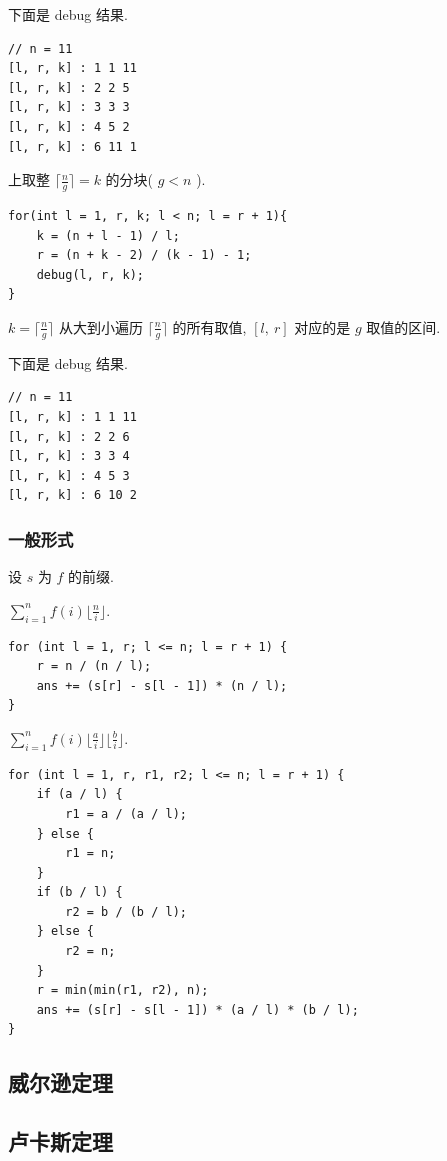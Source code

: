 \documentclass[UTF8, a4paper, titlepage, twoside]{ctexart}
\begin{document}
下面是 debug 结果.
\begin{lstlisting}
// n = 11
[l, r, k] : 1 1 11 
[l, r, k] : 2 2 5 
[l, r, k] : 3 3 3 
[l, r, k] : 4 5 2 
[l, r, k] : 6 11 1 
\end{lstlisting}

上取整 $\lceil \frac{n}{g} \rceil = k$ 的分块( $g < n$ ).
\begin{lstlisting}
for(int l = 1, r, k; l < n; l = r + 1){
    k = (n + l - 1) / l;
    r = (n + k - 2) / (k - 1) - 1;
    debug(l, r, k);
}
\end{lstlisting}
$k = \lceil \frac{n}{g} \rceil$ 从大到小遍历 $\lceil \frac{n}{g} \rceil$ 的所有取值, $[l, \ r]$ 对应的是 $g$ 取值的区间.

下面是 debug 结果.
\begin{lstlisting}
// n = 11
[l, r, k] : 1 1 11 
[l, r, k] : 2 2 6 
[l, r, k] : 3 3 4 
[l, r, k] : 4 5 3 
[l, r, k] : 6 10 2 
\end{lstlisting}

\subsubsection{ 一般形式 }

设 $s$ 为 $f$ 的前缀.

$\sum_{i=1}^n f(i)\lfloor \frac{n}{i} \rfloor$.

\begin{lstlisting}
for (int l = 1, r; l <= n; l = r + 1) {
    r = n / (n / l);
    ans += (s[r] - s[l - 1]) * (n / l);
}
\end{lstlisting}

$\sum_{i = 1}^{n}f(i){\lfloor{\frac{a}{i}}\rfloor\lfloor{\frac{b}{i}}\rfloor}$.

\begin{lstlisting}
for (int l = 1, r, r1, r2; l <= n; l = r + 1) {
    if (a / l) {
        r1 = a / (a / l);
    } else {
        r1 = n;
    }
    if (b / l) {
        r2 = b / (b / l);
    } else {
        r2 = n;
    }
    r = min(min(r1, r2), n);
    ans += (s[r] - s[l - 1]) * (a / l) * (b / l);
}
\end{lstlisting}

\subsection{ 威尔逊定理 }

\subsection{ 卢卡斯定理 }
\end{document}
